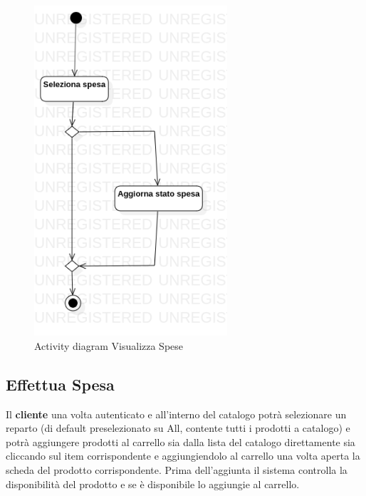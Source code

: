 \documentclass[12pt, a4paper]{report}
\begin{document}
\begin{figure}[h]
  \centering
  \includegraphics[width=0.64\textwidth]{Use Case Model!Controllo spese!ActivityControlloSpese!ActivityDiagramControlloSpese_12.png}
  \caption{Activity diagram Visualizza Spese}
\end{figure}

\newpage

\subsection{Effettua Spesa}

Il \textbf{cliente} una volta autenticato e all'interno del catalogo potrà
selezionare un reparto (di default preselezionato su All, contente tutti i
prodotti a catalogo) e potrà aggiungere prodotti al carrello sia dalla lista
del catalogo direttamente sia cliccando sul item corrispondente e
aggiungiendolo al carrello una volta aperta la scheda del prodotto
corrispondente. Prima dell'aggiunta il sistema controlla la disponibilità del
prodotto e se è disponibile lo aggiungie al carrello.
\end{document}
